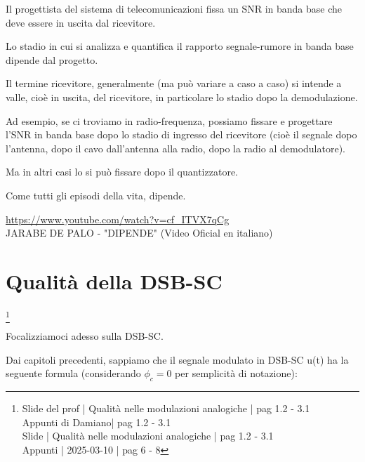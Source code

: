 \begin{tcolorbox}
Il progettista del sistema di telecomunicazioni fissa un SNR in banda base che deve essere in uscita dal ricevitore. \newline 

Lo stadio in cui si analizza e quantifica il rapporto segnale-rumore in banda base dipende dal progetto. \newline 

Il termine ricevitore, generalmente (ma può variare a caso a caso) 
si intende a valle, cioè in uscita, del ricevitore, in particolare lo stadio dopo la demodulazione. \newline 

Ad esempio, se ci troviamo in radio-frequenza, possiamo fissare e progettare l'SNR in banda base
dopo lo stadio di ingresso del ricevitore (cioè il segnale dopo l'antenna, dopo il cavo dall'antenna alla radio, dopo la radio al demodulatore). \newline 

Ma in altri casi lo si può fissare dopo il quantizzatore. \newline 

Come tutti gli episodi della vita, dipende. \newline 

\url{https://www.youtube.com/watch?v=cf_ITVX7qCg} \\
JARABE DE PALO - "DIPENDE" (Video Oficial en italiano)
\end{tcolorbox}

\newpage 


\section{Qualità della DSB-SC}
\footnote{Slide del prof | Qualità nelle modulazioni analogiche | pag 1.2 - 3.1\\  
Appunti di Damiano| pag 1.2 - 3.1 \\
Slide | Qualità nelle modulazioni analogiche | pag 1.2 - 3.1 \\
Appunti | 2025-03-10 | pag 6 - 8} 

Focalizziamoci adesso sulla DSB-SC. \newline 

Dai capitoli precedenti, sappiamo che il segnale modulato in DSB-SC u(t) ha la seguente formula (considerando $\phi_c = 0$ per semplicità di notazione): 

